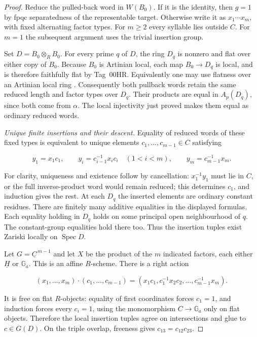 \begin{proof}
Reduce the pulled-back word in $W(B_0)$. If it is the identity,
then $g=1$ by fpqc separatedness of the representable target.
Otherwise write it as $x_1\cdots x_m$, with fixed alternating
factor types. For $m\geq2$ every syllable lies outside $C$.
For $m=1$ the subsequent argument uses the trivial insertion group.

Set $D=B_0\otimes_R B_0$. For every prime $q$ of $D$, the ring
$D_q$ is nonzero and flat over either copy of $B_0$.
Because $B_0$ is Artinian local, each map $B_0\to D_q$ is local,
and is therefore faithfully flat by Tag~00HR. Equivalently one
may use flatness over an Artinian local ring
\citep[Lemma~10.101.2, Tag~051G]{C_Stacks_051G}.
Consequently both pullback words retain the same reduced length
and factor types over $D_q$. Their products are equal in $A_p(D_q)$,
since both come from $\alpha$. The local injectivity just proved
makes them equal as ordinary reduced words.

\emph{Unique finite insertions and their descent.}
Equality of reduced words of these fixed types is equivalent to
unique elements $c_1,\ldots,c_{m-1}\in C$ satisfying

$$
y_1=x_1c_1,\qquad
 y_i=c_{i-1}^{-1}x_i c_i\quad(1<i<m),\qquad
 y_m=c_{m-1}^{-1}x_m.
$$

For clarity, uniqueness and existence follow by cancellation:
$x_1^{-1}y_1$ must lie in $C$, or the full inverse-product word
would remain reduced; this determines $c_1$, and induction gives
the rest. At each $D_q$ the inserted elements are ordinary
constant residues. There are finitely many additive equalities
in the displayed formulas. Each equality holding in $D_q$ holds
on some principal open neighbourhood of $q$. The constant-group
equalities hold there too. Thus the insertion tuples exist
Zariski locally on $\operatorname{Spec}D$.

Let $G=\underline C^{\,m-1}$ and let $X$ be the product of the
$m$ indicated factors, each either $\underline H$ or
$\mathbb G_a$. This is an affine $R$-scheme. There is a right action

$$
(x_1,\ldots,x_m)\cdot(c_1,\ldots,c_{m-1})
 =
 (x_1c_1,c_1^{-1}x_2c_2,\ldots,c_{m-1}^{-1}x_m).
$$

It is free on flat $R$-objects: equality of first coordinates
forces $c_1=1$, and induction forces every $c_i=1$, using the
monomorphism $C\to\mathbb G_a$ only on flat objects.
Therefore the local insertion tuples agree on intersections and
glue to $c\in G(D)$. On the triple overlap, freeness gives
$c_{13}=c_{12}c_{23}$.


\end{proof}

